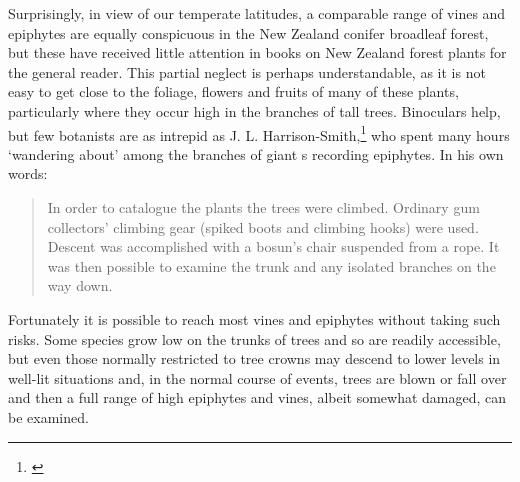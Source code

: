 Surprisingly, in view of our temperate latitudes, a comparable range of vines and epiphytes are equally conspicuous in the New Zealand conifer broadleaf forest, but these have received little attention in books on New Zealand forest plants for the general reader.
This partial neglect is perhaps understandable, as it is not easy to get close to the foliage, flowers and fruits of many of these plants, particularly where they occur high in the branches of tall trees.
Binoculars help, but few botanists are as intrepid as J. L. Harrison-Smith,\footnote{\cite{harrisonsmith1938kauri}} who spent many hours `wandering about' among the branches of giant s recording epiphytes.
In his own words:

\begin{quote}
	In order to catalogue the plants the trees were climbed.
	Ordinary gum collectors' climbing gear (spiked boots and climbing hooks) were used.
	Descent was accomplished with a bosun's chair suspended from a rope.
	It was then possible to examine the trunk and any isolated branches on the way down.
\end{quote}

Fortunately it is possible to reach most vines and epiphytes without taking such risks.
Some species grow low on the trunks of trees and so are readily accessible, but even those normally restricted to tree crowns may descend to lower levels in well-lit situations and, in the normal course of events, trees are blown or fall over and then a full range of high epiphytes and vines, albeit somewhat damaged, can be examined.

